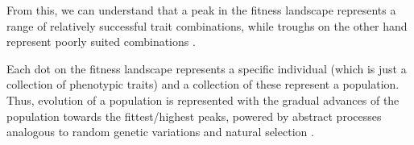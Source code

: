 

From this, we can understand that a peak in the fitness landscape represents a range of relatively successful trait combinations, while troughs on the other hand represent poorly suited combinations \cite{EibenSmith2003}.

Each dot on the fitness landscape represents a specific individual (which is just a collection of phenotypic traits) and a collection of these represent a population. Thus, evolution of a population is represented with the gradual advances of the population towards the fittest/highest peaks, powered by abstract processes analogous to random genetic variations and natural selection \cite{EibenSmith2003}.



